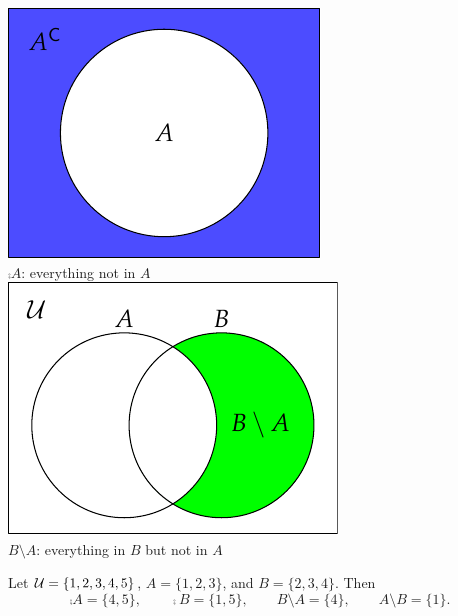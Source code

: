 \begin{minipage}{0.28\textwidth}\centering
\includegraphics[width=\textwidth]{sets-05-venncomp}\\
$\comp A$: everything not in $A$\\[20pt]
\includegraphics[width=\textwidth]{sets-06-vennrelcomp}\\
$B\setminus A$: everything in $B$ but not in $A$
\end{minipage}
\vspace{5pt}

\begin{example}{}{}
Let $\mathcal{U}=\{1,2,3,4,5\}$, $A=\{1,2,3\}$, and $B=\{2,3,4\}$. Then
\[\comp A=\{4,5\},\qquad \comp B=\{1,5\},\qquad B\setminus A=\{4\},\qquad A\setminus B=\{1\}.\]
\end{example}
\vspace{3pt}


